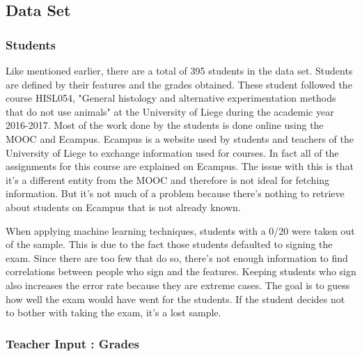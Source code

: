 \documentclass[a4paper,11pt]{report}
\numberwithin{figure}{section} %
\begin{document}
    
    
    \subsection{Data Set} \label{Data_Set}
    
    	\subsubsection{Students}
    Like mentioned earlier, there are a total of 395 students in the data set.
    Students are defined by their features and the grades obtained.
    These student followed the course HISL054, "General histology and alternative experimentation methods that do not use animals" at the University of Liege during the academic year 2016-2017.
    Most of the work done by the students is done online using the MOOC and Ecampus.
    Ecampus is a website used by students and teachers of the University of Liege to exchange information used for courses.
    In fact all of the assignments for this course are explained on Ecampus.
    The issue with this is that it's a different entity from the MOOC and therefore is not ideal for fetching information.
    But it's not much of a problem because there's nothing to retrieve about students on Ecampus that is not already known.\newline
    
    When applying machine learning techniques, students with a 0/20 were taken out of the sample.
    This is due to the fact those students defaulted to signing the exam.
    Since there are too few that do so, there's not enough information to find correlations between people who sign and the features.
    Keeping students who sign also increases the error rate because they are extreme cases.
    The goal is to guess how well the exam would have went for the students.
    If the student decides not to bother with taking the exam, it's a lost sample.\newline
    
    	\subsubsection{Teacher Input : Grades}
    
    
\end{document}
